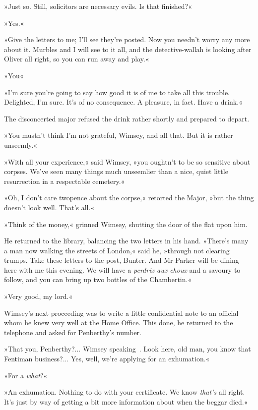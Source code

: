 »Just so. Still, solicitors are necessary evils. Is that finished?«

»Yes.«

»Give the letters to me; I'll see they're posted. Now you needn't worry any more about it. Murbles and I will see to it all, and the detective-wallah is looking after Oliver all right, so you can run away and play.«

»You\longdash«

»I'm sure you're going to say how good it is of me to take all this trouble. Delighted, I'm sure. It's of no consequence. A pleasure, in fact. Have a drink.«

The disconcerted major refused the drink rather shortly and prepared to depart.

»You mustn't think I'm not grateful, Wimsey, and all that. But it is rather unseemly.«

»With all your experience,« said Wimsey, »you oughtn't to be so sensitive about corpses. We've seen many things much unseemlier than a nice, quiet little resurrection in a respectable cemetery.«

»Oh, I don't care twopence about the corpse,« retorted the Major, »but the thing doesn't look well. That's all.«

»Think of the money,« grinned Wimsey, shutting the door of the flat upon him.

He returned to the library, balancing the two letters in his hand. »There's many a man now walking the streets of London,« said he, »through not clearing trumps. Take these letters to the post, Bunter. And Mr Parker will be dining here with me this evening. We will have a \textit{perdrix aux choux} and a savoury to follow, and you can bring up two bottles of the Chambertin.«

»Very good, my lord.«

Wimsey's next proceeding was to write a little confidential note to an official whom he knew very well at the Home Office. This done, he returned to the telephone and asked for Penberthy's number.

»That you, Penberthy?... Wimsey speaking\textellipsis~. Look here, old man, you know that Fentiman business?... Yes, well, we're applying for an exhumation.«

»For a \textit{what}?«

»An exhumation. Nothing to do with your certificate. We know \textit{that's} all right. It's just by way of getting a bit more information about when the beggar died.«

